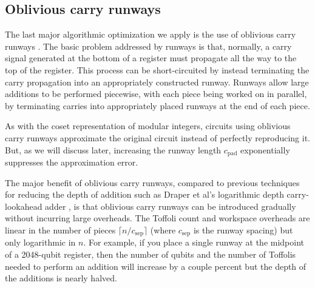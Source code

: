 \documentclass[superscriptaddress,notitlepage,longbibliography]{revtex4-1}
\theoremstyle{definition}
\theoremstyle{definition}
\newcommand{\gsep}{{c_{\text{sep}}}}
\newcommand{\gpad}{{c_{\text{pad}}}}
\begin{document}
\subsection{Oblivious carry runways}

The last major algorithmic optimization we apply is the use of oblivious carry runways \cite{gidney2019approximatepermutation}.
The basic problem addressed by runways is that, normally, a carry signal generated at the bottom of a register must propagate all the way to the top of the register.
This process can be short-circuited by instead terminating the carry propagation into an appropriately constructed runway.
Runways allow large additions to be performed piecewise, with each piece being worked on in parallel, by terminating carries into appropriately placed runways at the end of each piece.

As with the coset representation of modular integers, circuits using oblivious carry runways approximate the original circuit instead of perfectly reproducing it.
But, as we will discuss later, increasing the runway length $\gpad$ exponentially suppresses the approximation error.

The major benefit of oblivious carry runways, compared to previous techniques for reducing the depth of addition such as Draper et al's logarithmic depth carry-lookahead adder \cite{draper2004logarithmic}, is that oblivious carry runways can be introduced gradually without incurring large overheads.
The Toffoli count and workspace overheads are linear in the number of pieces $\lceil n/\gsep\rceil$ (where $\gsep$ is the runway spacing) but only logarithmic in $n$.
For example, if you place a single runway at the midpoint of a 2048-qubit register, then the number of qubits and the number of Toffolis needed to perform an addition will increase by a couple percent but the depth of the additions is nearly halved.
\end{document}
